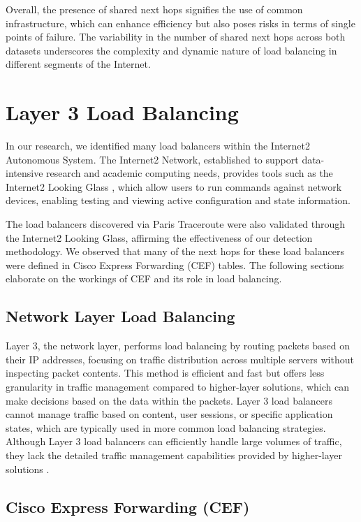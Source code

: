\documentclass[12pt]{cwru_thesis}
\begin{document}
Overall, the presence of shared next hops signifies the use of common infrastructure, which can enhance efficiency but also poses risks in terms of single points of failure. The variability in the number of shared next hops across both datasets underscores the complexity and dynamic nature of load balancing in different segments of the Internet.


\chapter{Layer 3 Load Balancing}

In our research, we identified many load balancers within the Internet2 Autonomous System. The Internet2 Network, established to support data-intensive research and academic computing needs, provides tools such as the Internet2 Looking Glass \cite{internet2_looking_glass}, which allow users to run commands against network devices, enabling testing and viewing active configuration and state information.

The load balancers discovered via Paris Traceroute were also validated through the Internet2 Looking Glass, affirming the effectiveness of our detection methodology. We observed that many of the next hops for these load balancers were defined in Cisco Express Forwarding (CEF) tables. The following sections elaborate on the workings of CEF and its role in load balancing.

\section{Network Layer Load Balancing}

Layer 3, the network layer, performs load balancing by routing packets based on their IP addresses, focusing on traffic distribution across multiple servers without inspecting packet contents. This method is efficient and fast but offers less granularity in traffic management compared to higher-layer solutions, which can make decisions based on the data within the packets. Layer 3 load balancers cannot manage traffic based on content, user sessions, or specific application states, which are typically used in more common load balancing strategies. Although Layer 3 load balancers can efficiently handle large volumes of traffic, they lack the detailed traffic management capabilities provided by higher-layer solutions \cite{zhang}.

\section{Cisco Express Forwarding (CEF)}
\end{document}
